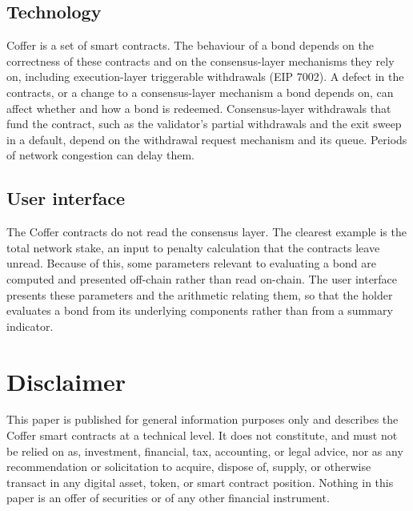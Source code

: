 \documentclass{article}
\begin{document}
\subsection{Technology}
Coffer is a set of smart contracts. The behaviour of a bond depends on the correctness of these contracts and on the consensus-layer mechanisms they rely on, including execution-layer triggerable withdrawals (EIP 7002). A defect in the contracts, or a change to a consensus-layer mechanism a bond depends on, can affect whether and how a bond is redeemed. Consensus-layer withdrawals that fund the contract, such as the validator's partial withdrawals and the exit sweep in a default, depend on the withdrawal request mechanism and its queue. Periods of network congestion can delay them.

\subsection{User interface}
The Coffer contracts do not read the consensus layer. The clearest example is the total network stake, an input to penalty calculation that the contracts leave unread. Because of this, some parameters relevant to evaluating a bond are computed and presented off-chain rather than read on-chain. The user interface presents these parameters and the arithmetic relating them, so that the holder evaluates a bond from its underlying components rather than from a summary indicator.

\section*{Disclaimer}

This paper is published for general information purposes only and describes the Coffer smart contracts at a technical level. It does not constitute, and must not be relied on as, investment, financial, tax, accounting, or legal advice, nor as any recommendation or solicitation to acquire, dispose of, supply, or otherwise transact in any digital asset, token, or smart contract position. Nothing in this paper is an offer of securities or of any other financial instrument.
\end{document}
